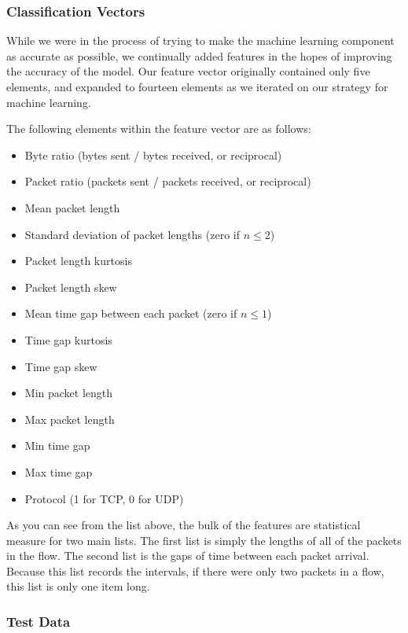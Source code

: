 \documentclass[a4paper, 11pt]{article} %
\begin{document}
\subsubsection{Classification Vectors}
\label{classification-vectors}

While we were in the process of trying to make the machine learning component as
accurate as possible, we continually added features in the hopes of improving
the accuracy of the model. Our feature vector originally contained only five
elements, and expanded to fourteen elements as we iterated on our strategy for
machine learning.

The following elements within the feature vector are as follows:

\begin{itemize}
    \item Byte ratio (bytes sent / bytes received, or reciprocal)
    \item Packet ratio (packets sent / packets received, or reciprocal)
    \item Mean packet length
    \item Standard deviation of packet lengths (zero if $n \leq 2$)
    \item Packet length kurtosis
    \item Packet length skew
    \item Mean time gap between each packet (zero if $n \leq 1$)
    \item Time gap kurtosis
    \item Time gap skew
    \item Min packet length
    \item Max packet length
    \item Min time gap
    \item Max time gap
    \item Protocol (1 for TCP, 0 for UDP)
\end{itemize}

As you can see from the list above, the bulk of the features are statistical
measure for two main lists. The first list is simply the lengths of all of the
packets in the flow. The second list is the gaps of time between each packet
arrival. Because this list records the intervals, if there were only two packets
in a flow, this list is only one item long.

\subsubsection{Test Data}
\end{document}
